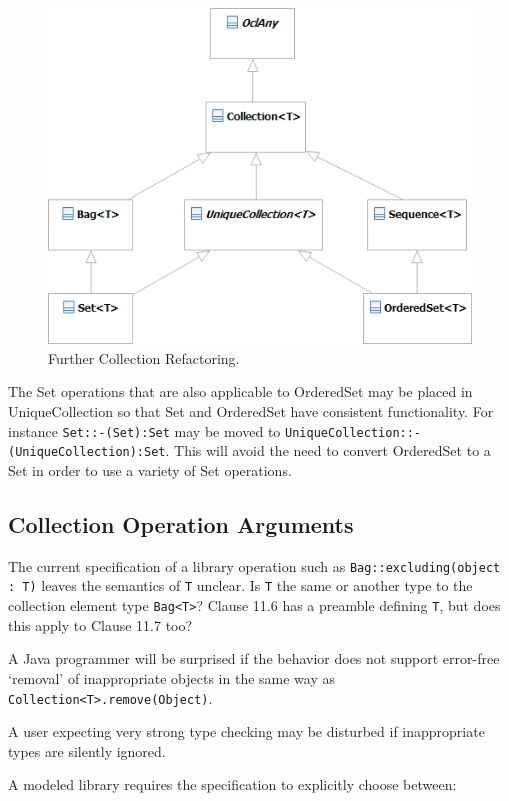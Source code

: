 \documentclass{eceasst}
\begin{document}
\begin{figure}
  \begin{center}
    \includegraphics[width=4.5in]{Collections_2_4.png}
  \end{center}
  \caption{Further Collection Refactoring.}
  \label{fig:Collections_2_4}
\end{figure}

The Set operations that are also applicable to OrderedSet may be placed in UniqueCollection so that Set and OrderedSet have consistent functionality. For instance \verb|Set::-(Set):Set| may be moved to \verb|UniqueCollection::-(UniqueCollection):Set|. This will avoid the need to convert OrderedSet to a Set in order to use a variety of Set operations.

\subsection{Collection Operation Arguments}

The current specification of a library operation such as \verb|Bag::excluding(object : T)| leaves the semantics of \verb|T| unclear. Is \verb|T| the same or another type to the collection element type \verb|Bag<T>|? Clause 11.6 has a preamble defining \verb|T|, but does this apply to Clause 11.7 too?

A Java programmer will be surprised if the behavior does not support error-free `removal' of inappropriate objects in the same way as \verb|Collection<T>.remove(Object)|.

A user expecting very strong type checking may be disturbed if inappropriate types are silently ignored.

A modeled library requires the specification to explicitly choose between:
\end{document}
